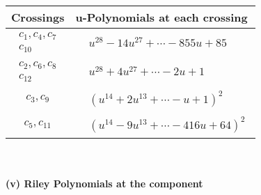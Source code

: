 \documentclass[1p]{elsarticle_modified}
\theoremstyle{definition}
\begin{document}
\begin{tabular}{m{50pt}|m{274pt}}
Crossings & \hspace{64pt}u-Polynomials at each crossing \\
\hline $$\begin{aligned}c_{1},c_{4},c_{7}\\c_{10}\end{aligned}$$&$\begin{aligned}
&u^{28}-14 u^{27}+\cdots-855 u+85
\end{aligned}$\\
\hline $$\begin{aligned}c_{2},c_{6},c_{8}\\c_{12}\end{aligned}$$&$\begin{aligned}
&u^{28}+4 u^{27}+\cdots-2 u+1
\end{aligned}$\\
\hline $$\begin{aligned}c_{3},c_{9}\end{aligned}$$&$\begin{aligned}
&(u^{14}+2 u^{13}+\cdots- u+1)^{2}
\end{aligned}$\\
\hline $$\begin{aligned}c_{5},c_{11}\end{aligned}$$&$\begin{aligned}
&(u^{14}-9 u^{13}+\cdots-416 u+64)^{2}
\end{aligned}$\\
\hline
\end{tabular}\\~\\
\newpage\renewcommand{\arraystretch}{1}
\flushleft \textbf{(v) Riley Polynomials at the component}\newline \\
\end{document}
